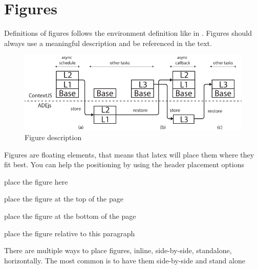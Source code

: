 

\section{Figures}
\label{sec:figures}

Definitions of figures follows the environment definition like in .
Figures should always use a meaningful description and be referenced in the text.

\begin{figure}
  \centering
  \includegraphics[width=0.75\columnwidth]{figures/approach}
  \caption{Figure description}
  \label{fig:example}
\end{figure}

Figures are floating elements, that means that latex will place them where they fit best. You can help the positioning by using the header placement options
\begin{description}[labelindent=1cm]
  \item[h] place the figure here
  \item[t] place the figure at the top of the page
  \item[b] place the figure at the bottom of the page
  \item[p] place the figure relative to this paragraph 
\end{description} 

There are multiple ways to place figures, inline, side-by-side, standalone, horizontally. The most common is to have them side-by-side and stand alone

